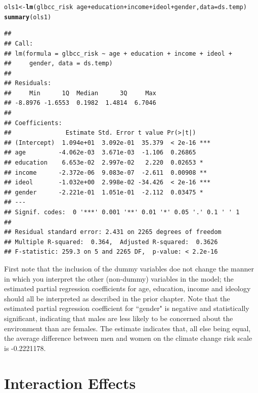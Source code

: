 \documentclass[11pt,openany]{book}
\makeatletter
\newcommand{\hlopt}[1]{\textcolor[rgb]{0,0,0}{#1}}%
\newcommand{\hlstd}[1]{\textcolor[rgb]{0.345,0.345,0.345}{#1}}%
\newcommand{\hlkwb}[1]{\textcolor[rgb]{0.69,0.353,0.396}{#1}}%
\newcommand{\hlkwc}[1]{\textcolor[rgb]{0.333,0.667,0.333}{#1}}%
\newcommand{\hlkwd}[1]{\textcolor[rgb]{0.737,0.353,0.396}{\textbf{#1}}}%
\newenvironment{kframe}{%
 \def\at@end@of@kframe{}%
 \ifinner\ifhmode%
  \def\at@end@of@kframe{\end{minipage}}%
  \begin{minipage}{\columnwidth}%
 \fi\fi%
 \def\FrameCommand##1{\hskip\@totalleftmargin \hskip-\fboxsep
 \colorbox{shadecolor}{##1}\hskip-\fboxsep
     \hskip-\linewidth \hskip-\@totalleftmargin \hskip\columnwidth}%
 \MakeFramed {\advance\hsize-\width
   \@totalleftmargin\z@ \linewidth\hsize
   \@setminipage}}%
 {\par\unskip\endMakeFramed%
 \at@end@of@kframe}
\newenvironment{knitrout}{}{} %
\renewenvironment{knitrout}{\begin{singlespace}}{\end{singlespace}}
\makeatother
\begin{document}
\begin{knitrout}
\color{fgcolor}\begin{kframe}
\begin{alltt}
\hlstd{ols1} \hlkwb{<-} \hlkwd{lm}\hlstd{(glbcc_risk} \hlopt{~} \hlstd{age} \hlopt{+} \hlstd{education} \hlopt{+} \hlstd{income} \hlopt{+} \hlstd{ideol} \hlopt{+} \hlstd{gender,} \hlkwc{data} \hlstd{= ds.temp)}
\hlkwd{summary}\hlstd{(ols1)}
\end{alltt}
\begin{verbatim}
## 
## Call:
## lm(formula = glbcc_risk ~ age + education + income + ideol + 
##     gender, data = ds.temp)
## 
## Residuals:
##     Min      1Q  Median      3Q     Max 
## -8.8976 -1.6553  0.1982  1.4814  6.7046 
## 
## Coefficients:
##               Estimate Std. Error t value Pr(>|t|)    
## (Intercept)  1.094e+01  3.092e-01  35.379  < 2e-16 ***
## age         -4.062e-03  3.671e-03  -1.106  0.26865    
## education    6.653e-02  2.997e-02   2.220  0.02653 *  
## income      -2.372e-06  9.083e-07  -2.611  0.00908 ** 
## ideol       -1.032e+00  2.998e-02 -34.426  < 2e-16 ***
## gender      -2.221e-01  1.051e-01  -2.112  0.03475 *  
## ---
## Signif. codes:  0 '***' 0.001 '**' 0.01 '*' 0.05 '.' 0.1 ' ' 1
## 
## Residual standard error: 2.431 on 2265 degrees of freedom
## Multiple R-squared:  0.364,	Adjusted R-squared:  0.3626 
## F-statistic: 259.3 on 5 and 2265 DF,  p-value: < 2.2e-16
\end{verbatim}
\end{kframe}
\end{knitrout}
First note that the inclusion of the dummy variables doe not change the manner in which you interpret the other (non-dummy) variables in the model; the estimated partial regression coefficients for age, education, income and ideology should all be interpreted as described in the prior chapter. Note that the estimated partial regression coefficient for ``gender" is negative and statistically significant, indicating that males are less likely to be concerned about the environment than are females. The estimate indicates that, all else being equal, the average difference between men and women on the climate change risk scale is -0.2221178. 


\section{Interaction Effects}
\end{document}
